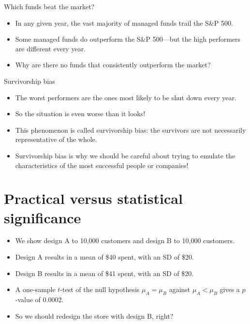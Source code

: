 \documentclass{beamer}\usepackage[]{graphicx}\usepackage[]{color}
\begin{document}
\begin{darkframes}
    \begin{frame}
    \end{frame}

    \begin{frame}{Which funds beat the market?}
      \begin{itemize}[<+->]
        \item In any given year, the vast majority of managed funds trail the S\&P 500.
        \item Some managed funds do outperform the S\&P 500---but the high performers are \alert{different} every year.
        \item Why are there no funds that consistently outperform the market?
      \end{itemize}
    \end{frame}

    \begin{frame}{Survivorship bias}
      \begin{itemize}[<+->]
        \item The worst performers are the ones most likely to be shut down every year.
        \item So the situation is even worse than it looks!
        \item This phenomenon is called \alert{survivorship bias}: the survivors are not necessarily representative of the whole.
        \item Survivorship bias is why we should be careful about trying to emulate the characteristics of the most successful people or companies!
      \end{itemize}
    \end{frame}

    \section{Practical versus statistical significance}

    \begin{frame}
      \begin{itemize}[<+->]
        \item We show design A to 10,000 customers and design B to 10,000 customers.
        \item Design A results in a mean of \$40 spent, with an SD of \$20.
        \item Design B results in a mean of \$41 spent, with an SD of \$20.
        \item A one-sample $t$-test of the null hypothesis $\mu_A=\mu_B$ against $\mu_A<\mu_B$ gives a $p$-value of $0.0002$.
        \item So we should redesign the store with design B, right?
      \end{itemize}
    \end{frame}


\end{darkframes}
\end{document}
